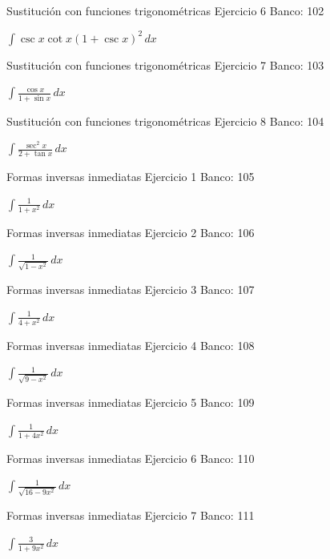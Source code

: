 \documentclass[aspectratio=169,12pt]{beamer}
\newcommand{\ejercicio}[1]{%
  \begin{center}
  \vfill
  {\fontsize{24}{30}\selectfont #1}
  \vfill
  \end{center}
}
\begin{document}
\begin{frame}{Sustitución con funciones trigonométricas}
\small Ejercicio 6 \hfill Banco: 102
\ejercicio{$\displaystyle \int\csc x\cot x(1+\csc x)^2\,dx$}
\end{frame}

\begin{frame}{Sustitución con funciones trigonométricas}
\small Ejercicio 7 \hfill Banco: 103
\ejercicio{$\displaystyle \int\frac{\cos x}{1+\sin x}\,dx$}
\end{frame}

\begin{frame}{Sustitución con funciones trigonométricas}
\small Ejercicio 8 \hfill Banco: 104
\ejercicio{$\displaystyle \int\frac{\sec^2x}{2+\tan x}\,dx$}
\end{frame}

\begin{frame}{Formas inversas inmediatas}
\small Ejercicio 1 \hfill Banco: 105
\ejercicio{$\displaystyle \int\frac{1}{1+x^2}\,dx$}
\end{frame}

\begin{frame}{Formas inversas inmediatas}
\small Ejercicio 2 \hfill Banco: 106
\ejercicio{$\displaystyle \int\frac{1}{\sqrt{1-x^2}}\,dx$}
\end{frame}

\begin{frame}{Formas inversas inmediatas}
\small Ejercicio 3 \hfill Banco: 107
\ejercicio{$\displaystyle \int\frac{1}{4+x^2}\,dx$}
\end{frame}

\begin{frame}{Formas inversas inmediatas}
\small Ejercicio 4 \hfill Banco: 108
\ejercicio{$\displaystyle \int\frac{1}{\sqrt{9-x^2}}\,dx$}
\end{frame}

\begin{frame}{Formas inversas inmediatas}
\small Ejercicio 5 \hfill Banco: 109
\ejercicio{$\displaystyle \int\frac{1}{1+4x^2}\,dx$}
\end{frame}

\begin{frame}{Formas inversas inmediatas}
\small Ejercicio 6 \hfill Banco: 110
\ejercicio{$\displaystyle \int\frac{1}{\sqrt{16-9x^2}}\,dx$}
\end{frame}

\begin{frame}{Formas inversas inmediatas}
\small Ejercicio 7 \hfill Banco: 111
\ejercicio{$\displaystyle \int\frac{3}{1+9x^2}\,dx$}
\end{frame}
\end{document}
